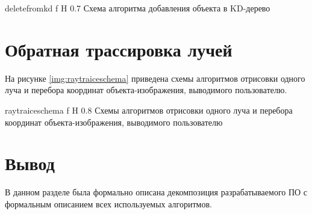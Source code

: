 {deletefromkd}
{f}
{H}
{0.7\textwidth}
{Схема алгоритма добавления объекта в KD-дерево}

\section{Обратная трассировка лучей}

На рисунке \ref{img:raytraiceschema} приведена схемы алгоритмов отрисовки одного луча и перебора координат объекта-изображения, выводимого пользователю.

{raytraiceschema}
{f}
{H}
{0.8\textwidth}
{Схемы алгоритмов отрисовки одного луча и перебора координат объекта-изображения, выводимого пользователю}

\section*{Вывод}

В данном разделе была формально описана декомпозиция разрабатываемого ПО с формальным описанием всех используемых алгоритмов.

